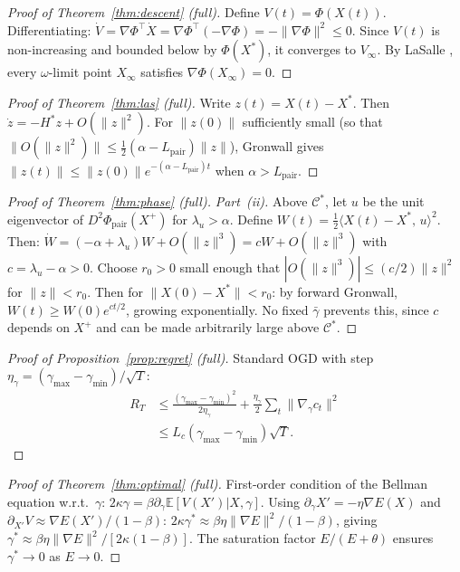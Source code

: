 \documentclass[final]{siamltex}
\newcommand{\E}{\mathbb{E}}
\newcommand{\norm}[1]{\lVert #1 \rVert}
\newcommand{\inner}[2]{\langle #1,\, #2 \rangle}
\providecommand{\grad}{\nabla}
\newcommand{\Cman}{\mathcal{C}^*}
\newcommand{\Xst}{X^*}
\newcommand{\Lpair}{L_{\mathrm{pair}}}
\begin{document}
\begin{appendix}
\begin{proof}[Proof of Theorem~\ref{thm:descent} (full)]
Define $V(t)=\Phi(X(t))$. Differentiating:
$\dot{V}=\grad\Phi^\top\dot{X}=\grad\Phi^\top(-\grad\Phi)
=-\norm{\grad\Phi}^2\le 0$. Since $V(t)$ is non-increasing and
bounded below by $\Phi(\Xst)$, it converges to $V_\infty$. By
LaSalle \cite{lasalle1960}, every $\omega$-limit point $X_\infty$
satisfies $\grad\Phi(X_\infty)=0$.
\end{proof}

\begin{proof}[Proof of Theorem~\ref{thm:las} (full)]
Write $z(t)=X(t)-\Xst$. Then $\dot{z}=-H^*z+O(\norm{z}^2)$.
For $\norm{z(0)}$ sufficiently small (so that
$\norm{O(\norm{z}^2)} \le \tfrac{1}{2}(\alpha{-}\Lpair)\norm{z}$),
Gronwall gives
$\norm{z(t)}\le\norm{z(0)}e^{-(\alpha-\Lpair)t}$
when $\alpha>\Lpair$.
\end{proof}

\begin{proof}[Proof of Theorem~\ref{thm:phase} (full)]
\textit{Part~(ii).} Above $\Cman$, let $u$ be the unit eigenvector
of $D^2\Phi_{\mathrm{pair}}(X^+)$ for $\lambda_u>\alpha$. Define
$W(t)=\frac{1}{2}\inner{X(t){-}\Xst}{u}^2$. Then:
$\dot{W}=(-\alpha+\lambda_u)W+O(\norm{z}^3)=cW+O(\norm{z}^3)$
with $c=\lambda_u-\alpha>0$. Choose $r_0 > 0$ small enough that
$|O(\norm{z}^3)| \le (c/2)\norm{z}^2$ for $\norm{z}<r_0$.
Then for $\norm{X(0){-}\Xst} < r_0$: by forward Gronwall,
$W(t)\ge W(0)e^{ct/2}$, growing exponentially. No fixed
$\bar{\gamma}$ prevents this, since $c$ depends on $X^+$ and can
be made arbitrarily large above $\Cman$.
\end{proof}

\begin{proof}[Proof of Proposition~\ref{prop:regret} (full)]
Standard OGD \cite{hazan2016oco} with step
$\eta_\gamma=(\gamma_{\max}{-}\gamma_{\min})/\sqrt{T}$:
\begin{align*}
  R_T &\le \frac{(\gamma_{\max}{-}\gamma_{\min})^2}{2\eta_\gamma}
  + \frac{\eta_\gamma}{2}\sum_t\norm{\grad_\gamma c_t}^2\\
  &\le L_c(\gamma_{\max}{-}\gamma_{\min})\sqrt{T}.
\end{align*}
\end{proof}

\begin{proof}[Proof of Theorem~\ref{thm:optimal} (full)]
First-order condition of the Bellman equation w.r.t.\ $\gamma$:
$2\kappa\gamma=\beta\partial_\gamma\E[V(X')|X,\gamma]$. Using
$\partial_\gamma X'=-\eta\grad E(X)$ and
$\partial_{X'}V\approx\grad E(X')/(1{-}\beta)$:
$2\kappa\gamma^*\approx\beta\eta\norm{\grad E}^2/(1{-}\beta)$,
giving $\gamma^*\approx\beta\eta\norm{\grad E}^2/[2\kappa(1{-}\beta)]$.
The saturation factor $E/(E{+}\theta)$ ensures $\gamma^*\to 0$ as
$E\to 0$.
\end{proof}


\end{appendix}
\end{document}
